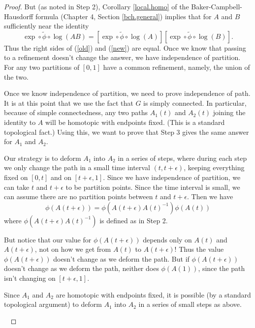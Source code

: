 \documentclass{amsbook}
\theoremstyle{plain}
\numberwithin{equation}{chapter}
\numberwithin{theorem}{chapter}
\begin{document}
\begin{proof}
But (as noted in Step 2), Corollary \ref{local.homo} of the
Baker-Campbell-Hausdorff formula (Chapter 4, Section \ref{bch.general})
implies that for $A$ and $B$ sufficiently near the identity
\[
\exp\circ\widetilde{\phi}\circ\log(AB)=\left[  \exp\circ\widetilde{\phi}%
\circ\log(A)\right]  \left[  \exp\circ\widetilde{\phi}\circ\log(B)\right]
\text{.}%
\]
Thus the right sides of (\ref{old}) and (\ref{new}) are equal. Once we know
that passing to a refinement doesn't change the answer, we have independence
of partition. For any two partitions of $\left[  0,1\right]  $ have a common
refinement, namely, the union of the two.

Once we know independence of partition, we need to prove independence of path.
It is at this point that we use the fact that $G$ is simply connected. In
particular, because of simple connectedness, any two paths $A_{1}(t)$ and
$A_{2}(t)$ joining the identity to $A$ will be homotopic with endpoints fixed.
(This is a standard topological fact.) Using this, we want to prove that Step
3 gives the same answer for $A_{1}$ and $A_{2}$.

Our strategy is to deform $A_{1}$ into $A_{2}$ in a series of steps, where
during each step we only change the path in a small time interval
$(t,t+\epsilon)$, keeping everything fixed on $[0,t]$ and on $[t+\epsilon,1]$.
Since we have independence of partition, we can take $t$ and $t+\epsilon$ to
be partition points. Since the time interval is small, we can assume there are
no partition points between $t$ and $t+\epsilon$. Then we have
\[
\phi\left(  A(t+\epsilon)\right)  =\phi\left(  A(t+\epsilon)A(t)^{-1}\right)
\phi\left(  A(t)\right)
\]
where $\phi\left(  A(t+\epsilon)A(t)^{-1}\right)  $ is defined as in Step 2.

But notice that our value for $\phi\left(  A(t+\epsilon)\right)  $ depends
only on $A\left(  t\right)  $ and $A\left(  t+\epsilon\right)  $, not on how
we get from $A\left(  t\right)  $ to $A\left(  t+\epsilon\right)  $! Thus the
value $\phi\left(  A(t+\epsilon)\right)  $ doesn't change as we deform the
path. But if $\phi\left(  A(t+\epsilon)\right)  $ doesn't change as we deform
the path, neither does $\phi\left(  A(1)\right)  $, since the path isn't
changing on $[t+\epsilon,1]$.

Since $A_{1}$ and $A_{2}$ are homotopic with endpoints fixed, it is possible
(by a standard topological argument) to deform $A_{1}$ into $A_{2}$ in a
series of small steps as above.

\ 


\end{proof}
\end{document}

